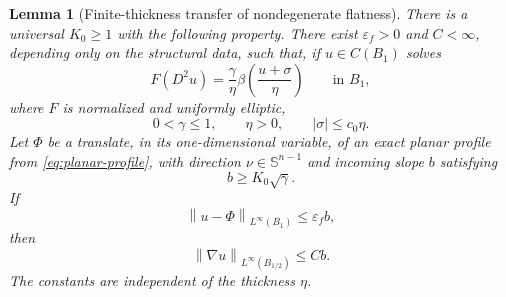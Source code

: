 \documentclass[11pt,letterpaper]{amsart}
\numberwithin{equation}{section}
\newcommand{\norm}[1]{\left\lVert #1\right\rVert}
\newtheorem{lemma}[theorem]{Lemma}
\theoremstyle{definition}
\theoremstyle{remark}
\begin{document}
\begin{lemma}[Finite-thickness transfer of nondegenerate flatness]
\label{lem:finite-thickness-transfer}
There is a universal $K_0\geq1$ with the following property.  There exist
$\varepsilon_f>0$ and $C<\infty$, depending only on the structural data,
such that, if $u\in C(B_1)$ solves
$$
F(D^2u)
=
\frac{\gamma}{\eta}
\beta\left(\frac{u+\sigma}{\eta}\right)
\qquad\text{in }B_1,
$$
where $F$ is normalized and uniformly elliptic,
$$
0<\gamma\leq1,
\qquad
\eta>0,
\qquad
|\sigma|\leq c_0\eta.
$$
Let $\Phi$ be a translate, in its one-dimensional variable, of an exact
planar profile from \eqref{eq:planar-profile}, with direction
$\nu\in\mathbb S^{n-1}$ and incoming slope $b$ satisfying
$$
b\geq K_0\sqrt\gamma.
$$
If
\begin{equation}\label{eq:finite-thickness-flatness}
\norm{u-\Phi}_{L^\infty(B_1)}
\leq\varepsilon_f b,
\end{equation}
then
\begin{equation}\label{eq:finite-thickness-lipschitz}
\norm{\nabla u}_{L^\infty(B_{1/2})}
\leq Cb.
\end{equation}
The constants are independent of the thickness $\eta$.
\end{lemma}
\end{document}
